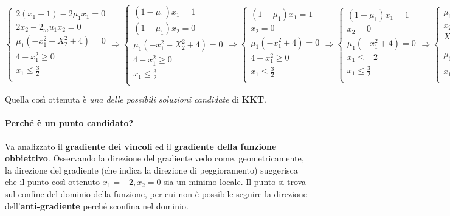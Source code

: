 \documentclass[\main/main.tex]{subfiles}
\begin{document}
\[
\begin{cases}
	2(x_1-1) - 2\mu_1 x_1 = 0\\
	2x_2 - 2_mu_1 x_2 = 0\\
	\mu_1 (-x_1^2 - X_2^2 + 4)= 0\\
	4-x_1^2 \geq 0  \\
	x_1 \leq \frac{3}{2}\\
\end{cases}
\Rightarrow
\begin{cases}
	(1-\mu_1)x_1 = 1\\
	(1-\mu_1)x_2=0\\
	\mu_1 (-x_1^2 - X_2^2 + 4)= 0\\
	4-x_1^2 \geq 0  \\
	x_1 \leq \frac{3}{2}\\
\end{cases}
\Rightarrow
\begin{cases}
	(1-\mu_1)x_1 = 1\\
	x_2=0\\
	\mu_1 (-x_1^2 + 4)= 0\\
	4-x_1^2 \geq 0  \\
	x_1 \leq \frac{3}{2}\\
\end{cases}
\Rightarrow
\begin{cases}
	(1-\mu_1)x_1 = 1\\
	x_2=0\\
	\mu_1 (-x_1^2 + 4)= 0\\
	x_1 \leq -2  \\
	x_1 \leq \frac{3}{2}\\
\end{cases}
\Rightarrow
\begin{cases}
	\mu_1 > 0\\
	x_2=0\\
	X_1 = -2\\
	\mu_1 = \dfrac{2}{2}  \\
	x_1 \leq \frac{3}{2}\\
\end{cases}
\]

Quella così ottenuta è \textit{una delle possibili soluzioni candidate} di \textbf{KKT}. 

\paragraph{Perché è un punto candidato?} Va analizzato il \textbf{gradiente dei vincoli} ed il \textbf{gradiente della funzione obbiettivo}. Osservando la direzione del gradiente vedo come, geometricamente, la direzione del gradiente (che indica la direzione di peggioramento) suggerisca che il punto così ottenuto $x_1 = -2, x_2 = 0$ sia un minimo locale. Il punto si trova sul confine del dominio della funzione, per cui non è possibile seguire la direzione dell'\textbf{anti-gradiente} perché sconfina nel dominio.
\end{document}
